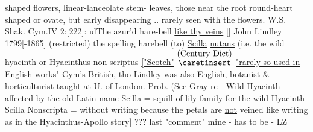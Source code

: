 \documentclass[a4paper]{article}
\begin{document}
\begin{minipage}[t]{0.6\textwidth}
\begin{minipage}[t]{0.9\textwidth}
shaped flowers, linear-lanceolate stem-
leaves, those near the root round-heart
shaped or ovate, but early disappearing
.. rarely seen with the flowers.
W.S. \sout{Shak.} Cym.IV 2:[222]: ul{The azur'd hare-bell}
\ul{like thy veins} [] John Lindley 1799[-1865]
(restricted) the spelling harebell
(to) \ul{Scilla} \ul{nutans} (i.e. the wild
hyacinth or Hyacinthus non-scriptus
\ul{
    ["Scotch"} 
\color{blue}
$\stackrel{\hbox{(Century Dict)}}{\hbox{$\caretinsert$}}$
\color{red}
\ul{"rarely so used in English}
works" \ul{Cym's British}, tho Lindley 
was also English, botanist \& horticulturist
taught at U. of London. Prob. (See
Gray re - Wild Hyacinth affected
by the old Latin name Scilla = squill
\sout{of} lily family for the wild Hyacinth
Scilla Nonscripta = without writing
because the petals are \ul{not} veined like
writing as in the Hyacinthus-Apollo story]
\color{blue}
??? last "comment" mine
- has to be - LZ
\end{minipage}
\end{minipage}
\end{document}
